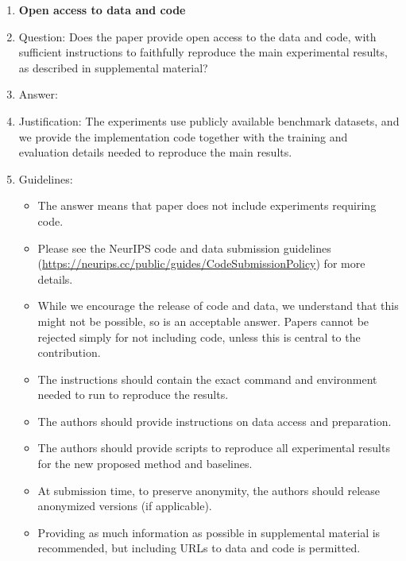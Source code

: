 \begin{enumerate}
\item {\bf Open access to data and code}
    \item[] Question: Does the paper provide open access to the data and code, with sufficient instructions to faithfully reproduce the main experimental results, as described in supplemental material?
    \item[] Answer: \answerYes{}
    \item[] Justification: The experiments use publicly available benchmark datasets, and we provide the implementation code together with the training and evaluation details needed to reproduce the main results.
    \item[] Guidelines:
    \begin{itemize}
        \item The answer \answerNA{} means that paper does not include experiments requiring code.
        \item Please see the NeurIPS code and data submission guidelines (\url{https://neurips.cc/public/guides/CodeSubmissionPolicy}) for more details.
        \item While we encourage the release of code and data, we understand that this might not be possible, so \answerNo{} is an acceptable answer. Papers cannot be rejected simply for not including code, unless this is central to the contribution.
        \item The instructions should contain the exact command and environment needed to run to reproduce the results.
        \item The authors should provide instructions on data access and preparation.
        \item The authors should provide scripts to reproduce all experimental results for the new proposed method and baselines.
        \item At submission time, to preserve anonymity, the authors should release anonymized versions (if applicable).
        \item Providing as much information as possible in supplemental material is recommended, but including URLs to data and code is permitted.
    \end{itemize}


\end{enumerate}
